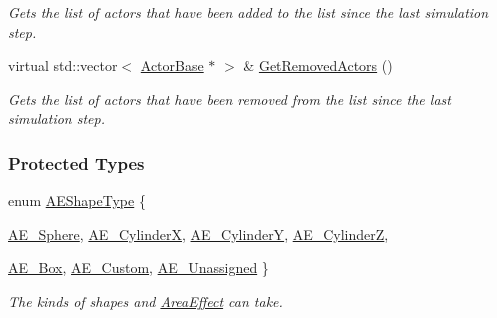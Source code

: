 \begin{DoxyCompactItemize}
\begin{DoxyCompactList}\small\item\em Gets the list of actors that have been added to the list since the last simulation step. \item\end{DoxyCompactList}\item 
virtual std::vector$<$ \hyperlink{classphys_1_1ActorBase}{ActorBase} $\ast$ $>$ \& \hyperlink{classphys_1_1AreaEffect_a021763db69e977a3a19ad7cc39df073b}{GetRemovedActors} ()
\begin{DoxyCompactList}\small\item\em Gets the list of actors that have been removed from the list since the last simulation step. \item\end{DoxyCompactList}\end{DoxyCompactItemize}
\subsubsection*{Protected Types}
\begin{DoxyCompactItemize}
\item 
enum \hyperlink{classphys_1_1AreaEffect_a99b8746c43eac266d48ad613110dc6f9}{AEShapeType} \{ \par
\hyperlink{classphys_1_1AreaEffect_a99b8746c43eac266d48ad613110dc6f9a607185bf8c230fe2c39df9d96bd66a09}{AE\_\-Sphere}, 
\hyperlink{classphys_1_1AreaEffect_a99b8746c43eac266d48ad613110dc6f9a623ebbf1c726ad947a74aff5d36d3b8f}{AE\_\-CylinderX}, 
\hyperlink{classphys_1_1AreaEffect_a99b8746c43eac266d48ad613110dc6f9a363e015e6e77fb2f74b63e5dd687a981}{AE\_\-CylinderY}, 
\hyperlink{classphys_1_1AreaEffect_a99b8746c43eac266d48ad613110dc6f9a001df4767697c5c30d2c7b4f318301ba}{AE\_\-CylinderZ}, 
\par
\hyperlink{classphys_1_1AreaEffect_a99b8746c43eac266d48ad613110dc6f9a579014c1569b6129ee8b2cf74e3a14e4}{AE\_\-Box}, 
\hyperlink{classphys_1_1AreaEffect_a99b8746c43eac266d48ad613110dc6f9a1c411d786f32da69b69e6f8dae26f977}{AE\_\-Custom}, 
\hyperlink{classphys_1_1AreaEffect_a99b8746c43eac266d48ad613110dc6f9a9eef62b75d698ff6ef4e74bd2a2df132}{AE\_\-Unassigned}
 \}
\begin{DoxyCompactList}\small\item\em The kinds of shapes and \hyperlink{classphys_1_1AreaEffect}{AreaEffect} can take. \item\end{DoxyCompactList}\end{DoxyCompactItemize}
